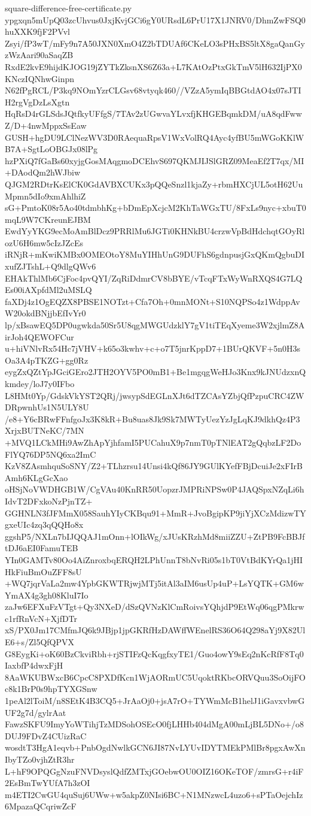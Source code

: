 \documentclass[11pt]{article}
\theoremstyle{definition}
\theoremstyle{remark}
\begin{document}
\begin{filecontents*}[overwrite]{square-difference-free-certificate.py}
ypgxqn5mUpQ03zcUhvus0JxjKvjGCi6gY0URsdL6PrU17X1JNRV0/DhmZwFSQ0huXXK9fjF2PVvl
Zsyi/fP3wT/mFy9n7A50JXN0XmO4Z2bTDUAf6CKeLO3sPHxBS5ltX8gaQanGyzWzAari90aSaqZB
RxdE2kvE9hijdKJOG19jZYTkZksnXS6Z63a+L7KAtOzPtxGkTmV5lH632IjPX0KNczIQNhwGinpn
N62fPgRCL/P3kq9NOmYzrCLGsv68vtyqk460//VZzA5ymIqBBGtdAO4x07sJTIH2rgVgDzLsXgtn
HqRsD4rGLSdsJQtfkyUFfgS/7TAv2zUGwvaYLvxfjKHGEBqmkDM/uA8qdFwwZ/D+4nwMppxSsEaw
GUSH+hgDU9LClNezWV3D0RAequaRpsV1WxVolRQ4Ayc4yfBU5mWGoKKlWB7A+SgtLoOBGJx08lPg
hzPXiQ7fGaBs60xyjgGosMAqgmoDCEhvS697QKMJIJSlGRZ09MeaEf2T7qx/MI+DAodQm2hWJbiw
QJGM2RDtrKsElCK0GdAVBXCUKx3pQQeSnzl1kjaZy+rbmHXCjUL5otH62UuMpmn5dIo9xmAhlhiZ
sG+PmtoK08r5Ao40tdmbhKg+bDmEpXcjcM2KhTaWGxTU/8FxLs9nyc+xbuT0mqL9W7CKreunEJBM
EwdYyYKG9ecMoAmBlDcz9PRRlMu6JGTi0KHNkBU4crzwVpBdHdchqtGOyRlozU6H6mw5cIzJZcEs
iRNjR+mKwiKMBx0OMEOtoY8MuYIHhUnG9DUFhS6gdnpusjGxQKmQgbuDIxufZJTshL+Q9dlgQWv6
EHAkThlMb6CjFoc4pvQYI/ZqRiDdmrCV8bBYE/vTcqFTxWyWnRXQS4G7LQEs00iAXpfdMl2uMSLQ
faXDj4z1OgEQZX8PBSE1NOTzt+Cfa7Oh+0mnMONt+S10NQPSo4z1WdppAvW20okdBNjjbEfIvYr0
lp/xBsawEQ5DP0ugwkda50Sr5U8qgMWGUdzklY7gV1tiTEqXyeme3W2xjlmZ8AirJoh4QEWOFCur
u+hiVNlvRx54Hc7jVHV+k65o3kwhv+c+o7T5jnrKppD7+1BUrQKVF+5n0H3sOa3A4pTKZG+gg0Rz
eygZxQZtYpJGciGEro2JTH2OYV5PO0mB1+Be1mgqgWeHJo3Knx9kJNUdzxnQkmdey/loJ7y0IFbo
L8HMt0Yp/GdskVkYST2QRj/jwsypSdEGLnXJt6dTZCAsYZbjQfPzpuCRC4ZWDRpwnhUs1N5ULY8U
/e8+Y6cBRwFFnfgoJx3K8kR+Bu8uas8Jk9Sk7MWTyUezYzJgLqKJ9dkhQz4P3XrjxBUTNeKC/7MN
+MVQ1LCkMHi9AwZhApYjhfamI5PUCahuX9p7nmT0pTNlEAT2gQqbzLF2DoFlYQ76DP5NQ6xa2ImC
KzV8ZAsmhquSoSNY/Z2+TLhzrsu14Unsi4kQf86JY9GUlKYefFBjDcuiJe2xFIrBAmh6KLgGcXao
oHSjNoVWDHGB1W/CgVAu40KnRR50UopzrJMPRiNPSw0P4JAQSpxNZqLi6hIdvT2DFxkoNzPjnTZ+
GGHNLN3fJFMmX058SauhYIyCKBqu91+MmR+JvoBgipKP9jiYjXCzMdizwTYgxeUIc4zq3qQQHo8x
ggshP5/NXLn7bIJQQAJ1mOnn+lOIkWg/xJUsKRzhMd8miiZZU+ZtPB9FcBBJftDJ6aEI0FamuTEB
YIn0GAMTv80Oo4AiZnroxbqERQH2LPhUnnT8bNvRi05s1bT0VtBdKYrQa1jHIHkFiuBmOuZFF8sU
+WQ7jqrVaLa2mw4YpbGKWTRjwjMTj5itAl3aIM6usUp4uP+LsYQTK+GM6wYmAX4g3gh08KluI7Io
zaJw6EFXuFzVTgt+Qy3NXeD/dSzQVNzKlCmRoivsYQhjdP9EtWq06qgPMkrwc1rfRnVcN+XjfDTr
xS/PX0Jm17CMfmJQ6k9JBjp1jpGKRfHzDAWffWEnelRS36O64Q298aYj9X82UlE6+s/Zl5QfQPVX
G8EygKi+oK60BzCkviRbh+rjSTIFzQcKqgfxyTE1/Guo4owY9sEq2nKcRfF8Tq0IaxbfP4dwxFjH
8AaWKUBWxcB6CpcC8PXDfKcn1WjAORmUC5UqoktRKbcORVQuu3SoOijFOc8k1BrP0s9hpTYXGSnw
1peAl2lToiM/n8SEtK4B3CQ5+JrAaOj0+jsA7rO+TYWmMcB1helJ1iGavxvbwGUF2g7d/gylrAat
FawzSKFU9ImyYoWTihjTzMDSohOSEcO0fjLHHb404dMgA00mLjBL5DNo+/o8DUJ9FDvZ4CUizRaC
wosdtT3HgA1eqvb+PnbOgdNwlkGCN6JI87NvLYUvIDYTMEkPMlBr8pgxAwXnIbyTZo0vjhZtR3hr
L+hF9OPQGgNzuFNVDsyslQdfZMTxjGOebwOU0OIZ16OKeTOF/zmrsG+r4iF2EsBmTwYUfA7h3zOI
m4ETI2CwGU4quSuj6UWw+w5akpZ0NIsi6BC+N1MNzwcL4uzo6+sPTaOejchIz6MpazaQCqriwZcF

\end{filecontents*}
\end{document}
